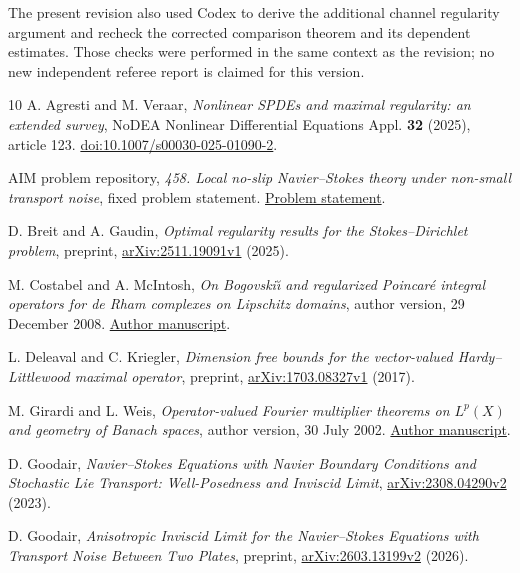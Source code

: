\documentclass[11pt]{article}
\numberwithin{equation}{section}
\theoremstyle{remark}
\begin{document}
The present revision also used Codex to derive the additional channel
regularity argument and recheck the corrected comparison theorem and its
dependent estimates. Those checks were performed in the same context as the
revision; no new independent referee report is claimed for this version.

\begin{thebibliography}{10}
A. Agresti and M. Veraar,
\emph{Nonlinear SPDEs and maximal regularity: an extended survey},
NoDEA Nonlinear Differential Equations Appl. \textbf{32} (2025), article 123.
\href{https://doi.org/10.1007/s00030-025-01090-2}{doi:10.1007/s00030-025-01090-2}.

AIM problem repository,
\emph{458. Local no-slip Navier--Stokes theory under non-small transport noise},
fixed problem statement.
\href{https://github.com/MColbrook/AIM/blob/a153f469ee0ea64e876b2ad97c79d252c19a3e22/problems/458-stochastic-navier-stokes-no-slip-local.md}{Problem statement}.

D. Breit and A. Gaudin,
\emph{Optimal regularity results for the Stokes--Dirichlet problem},
preprint, \href{https://arxiv.org/abs/2511.19091v1}{arXiv:2511.19091v1} (2025).

M. Costabel and A. McIntosh,
\emph{On Bogovski\u\i{} and regularized Poincar\'e integral operators for de Rham
complexes on Lipschitz domains}, author version, 29 December 2008.
\href{https://costabel.perso.math.cnrs.fr/publis/PoiBogdeRhv2.pdf}{Author manuscript}.

L. Deleaval and C. Kriegler,
\emph{Dimension free bounds for the vector-valued Hardy--Littlewood maximal operator},
preprint, \href{https://arxiv.org/abs/1703.08327v1}{arXiv:1703.08327v1} (2017).

M. Girardi and L. Weis,
\emph{Operator-valued Fourier multiplier theorems on $L^p(X)$ and geometry
of Banach spaces}, author version, 30 July 2002.
\href{https://people.math.sc.edu/girardi/papers/22.pdf}{Author manuscript}.

D. Goodair,
\emph{Navier--Stokes Equations with Navier Boundary Conditions and Stochastic
Lie Transport: Well-Posedness and Inviscid Limit},
\href{https://arxiv.org/abs/2308.04290v2}{arXiv:2308.04290v2} (2023).

D. Goodair,
\emph{Anisotropic Inviscid Limit for the Navier--Stokes Equations with
Transport Noise Between Two Plates},
preprint, \href{https://arxiv.org/abs/2603.13199v2}{arXiv:2603.13199v2} (2026).


\end{thebibliography}
\end{document}
